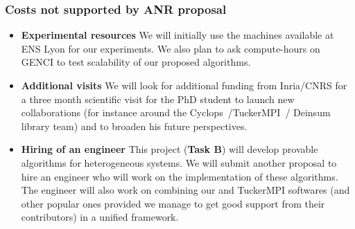\documentclass[a4paper,11pt]{article}
\begin{document}
	\subsubsection*{Costs not supported by ANR proposal}
	\begin{itemize}[leftmargin=-1pt]
		\item[] \textbf{Experimental resources} We will initially use the machines available at ENS Lyon for our experiments. We also plan to ask compute-hours on GENCI to test scalability of our proposed algorithms.
		\item[] \textbf{Additional visits} We will look for additional funding from Inria/CNRS for a three month scientific visit for the PhD student to launch new collaborations (for instance around the Cyclops~\cite{SMHD-IPDPS-2013}/TuckerMPI~\cite{BKK-TOMS-2020}/ Deinsum~\cite{ZKBSH-SC-2022} library team) and to broaden his future perspectives.		
		\item[] \textbf{Hiring of an engineer} This project (\textbf{Task B}) will develop provable algorithms for heterogeneous systems. We will submit another proposal to hire an engineer who will work on the implementation of these algorithms. The engineer will also work on combining our and TuckerMPI softwares (and other popular ones provided we manage to get good support from their contributors) in a unified framework.	
	\end{itemize}
%	
%	
%	
%	
%	
\end{document}
